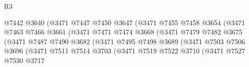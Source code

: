 \begin{lexlean}{R3}
\begin{coremodule}
                                        @7442
                                        @3640
                                        (@3471
                                          @7447
                                          @7450
                                          @3647
                                          (@3471
                                            @7455
                                            @7458
                                            @3654
                                            (@3471
                                              @7463
                                              @7466
                                              @3661
                                              (@3471
                                                @7471
                                                @7474
                                                @3668
                                                (@3471
                                                  @7479
                                                  @7482
                                                  @3675
                                                  (@3471
                                                    @7487
                                                    @7490
                                                    @3682
                                                    (@3471
                                                      @7495
                                                      @7498
                                                      @3689
                                                      (@3471
                                                        @7503
                                                        @7506
                                                        @3696
                                                        (@3471
                                                          @7511
                                                          @7514
                                                          @3703
                                                          (@3471
                                                            @7519
                                                            @7522
                                                            @3710
                                                            (@3471
                                                              @7527
                                                              @7530
                                                              @3717

\end{coremodule}
\end{lexlean}

